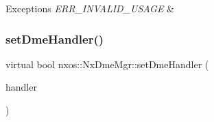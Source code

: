 \begin{DoxyExceptions}{Exceptions}
{\em E\+R\+R\+\_\+\+I\+N\+V\+A\+L\+I\+D\+\_\+\+U\+S\+A\+GE} & \\
\hline
\end{DoxyExceptions}
\mbox{\label{classnxos_1_1_nx_dme_mgr_a3d7e9ce8c28586d834f1504856e22988}} 
\subsubsection{\texorpdfstring{set\+Dme\+Handler()}{setDmeHandler()}}
{\footnotesize\ttfamily virtual bool nxos\+::\+Nx\+Dme\+Mgr\+::set\+Dme\+Handler (\begin{DoxyParamCaption}\item[{\mbox{\hyperlink{classnxos_1_1_nx_dme_mgr_handler}{Nx\+Dme\+Mgr\+Handler}} $\ast$}]{handler }\end{DoxyParamCaption})\hspace{0.3cm}{\ttfamily [pure virtual]}}

